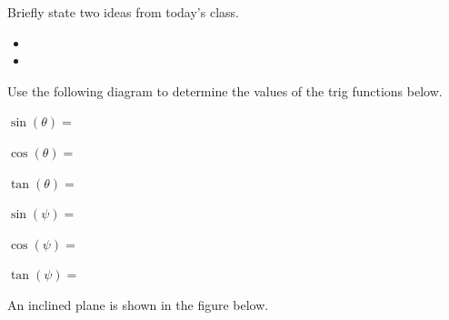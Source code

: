 \postClass

\begin{problem}
\item Briefly state two ideas from today's class.
  \begin{itemize}
  \item
  \item
  \end{itemize}
  \item Use the following diagram to determine the values of the trig
    functions below.

    \begin{multicols}{2}

        \scalebox{0.35}{}

        \columnbreak

        \begin{subproblem}
        \item $\sin(\theta) = $ \vfill
        \item $\cos(\theta) = $ \vfill
        \item $\tan(\theta) = $ \vfill
        \item $\sin(\psi) = $ \vfill
        \item $\cos(\psi) = $ \vfill
        \item $\tan(\psi) = $ \vfill
        \end{subproblem}
    \end{multicols}


  \item An inclined plane is shown in the figure below.


\end{problem}
